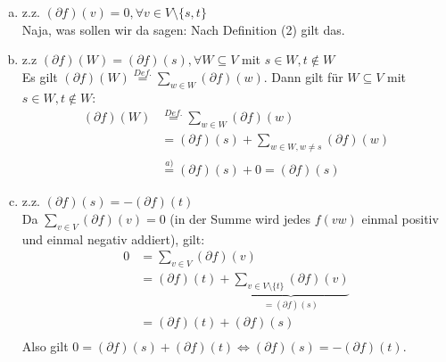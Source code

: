 \documentclass[11pt,a4paper,ngerman]{article}
\begin{document}
\begin{enumerate}[a)]
\item z.z. $(\partial f)(v) = 0, \forall v \in V \setminus \{s,t \}$ \\
Naja, was sollen wir da sagen: Nach Definition (2) gilt das.
\item z.z $(\partial f)(W) = (\partial f)(s), \forall W \subseteq V$ mit $s \in W, t \notin W$ \\
Es gilt $(\partial f)(W) \stackrel{Def.}{=} \sum_{w \in W} (\partial f)(w)$. Dann gilt für $W \subseteq V$ mit $s \in W, t \notin W$:
\begin{equation*}\begin{split}
(\partial f)(W) &\stackrel{Def.}{=} \sum_{w \in W} (\partial f)(w) \\
  &= (\partial f)(s) + \sum_{w \in W,w \neq s} (\partial f)(w) \\
  &\stackrel{a)}{=} (\partial f)(s) + 0 = (\partial f)(s)
\end{split}\end{equation*}
\item z.z. $(\partial f)(s) = -(\partial f)(t)$ \\
Da $\sum_{v \in V} (\partial f)(v) = 0$ (in der Summe wird jedes $f(vw)$ einmal positiv und einmal negativ addiert), gilt:
\begin{equation*}\begin{split}
  0 &= \sum_{v \in V} (\partial f)(v) \\
    &= (\partial f)(t) + \underbrace{\sum_{v \in V \setminus \{t \}} (\partial f)(v)}_{= (\partial f)(s)} \\
    &= (\partial f)(t) + (\partial f)(s) \\
\end{split}\end{equation*}
Also gilt $0 = (\partial f)(s) + (\partial f)(t) \Leftrightarrow (\partial f)(s) = -(\partial f)(t)$.
\end{enumerate}

\label{LastPage}
\end{document}
